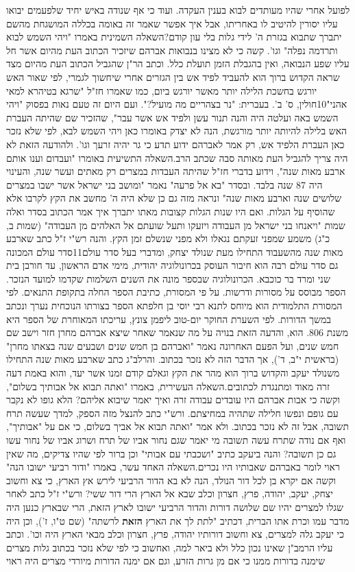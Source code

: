 \documentclass[12pt, openany]{book}
\begin{document}
לפועל אחרי שהיו מעותדים לבוא בענין העקדה. ועוד כי אף שנודה באיש יחיד שלפעמים יבואו עליו יסורין להיטיב לו באחריתו, אבל איך אפשר שאמר זה באומה בכללה המושגחת מהשם יתברך שתבוא בגזרת ה' לידי גלות בלי עון קודם?השאלה השמינית באמרו "ויהי השמש לבוא ותרדמה נפלה" וגו'. קשה כי לא מצינו בנבואות אברהם שיזכיר הכתוב העת מהיום אשר חל עליו שפע הנבואה, ואין בהגבלת הזמן תועלת כלל. וכתב הר"ן שהגביל הכתוב העת מהיום מצד שראה הקדוש ברוך הוא להעביד לפיד אש בין הגזרים אחרי שיחשוך לגמרי, לפי שאור האש יורגש בחשכת הלילה יותר מאשר יורגש ביום, כמו שאמרו חז"ל "שרגא בטיהרא למאי אהני"10חולין, ס' ב'. בעברית: "נר בצהריים מה מועיל?". ועם היום זה טעם נאות בפסוק "ויהי השמש באה ועלטה היה והנה תנור עשן ולפיד אש אשר עבר", שהזכיר שם שהיתה העברת האש בלילה להיותה יותר מורגשת, הנה לא יצדק באומרו כאן ויהי השמש לבא, לפי שלא נזכר כאן העברת הלפיד אש, רק אמר לאברהם ידוע תדע כי גר יהיה זרעך וגו'. ולהודעה הזאת לא היה צריך להגביל העת מאותה סבה שכתב הרב.השאלה התשיעית באומרו "ועבדום וענו אותם ארבע מאות שנה", וידוע בדברי חז"ל שהיתה העבדות במצרים רק מאתים ועשר שנה, והעינוי היה 87 שנה בלבד. ובסדר "בא אל פרעה" נאמר "ומושב בני ישראל אשר ישבו במצרים שלושים שנה וארבע מאות שנה" ונראה מזה גם כן שלא היה ה' מחשב את הקץ לקרבו אלא שהוסיף על הגלות. ואם היו שנות הגלות קצובות מאתו יתברך איך אמר הכתוב בסדר ואלה שמות "ויאנחו בני ישראל מן העבודה ויזעקו ותעל שועתם אל האלהים מן העבודה" (שמות ב, כ"ג) משמע שמפני זעקתם נגאלו ולא מפני שנשלם זמן הקץ. והנה רש"י ז"ל כתב שארבע מאות שנה מהשעבוד התחילו מעת שנולד יצחק, ומדברי בעל סדר עולם11סדר עולם המכונה גם סדר עולם רבה הוא חיבור העוסק בכרונולוגיה יהודית, מימי אדם הראשון, עד חורבן בית שני ומרד בר כוכבא. הכרונולוגיה שבספר מונה את השנים השלמות שקדמו למועד הנזכר. הספר מבוסס על מסורות ודרשות. על פי המסורת, כתיבת הספר החלה בתקופת התנאים. לפי המסורת התלמודית הוא מיוחס לתנא רבי יוסי בן חלפתא הספר בצורתו הנוכחית נערך ונכתב במשך הדורות. לפי השערת החוקר יום-טוב ליפמן צונץ, עריכתו המאוחרת של הספר היא משנת 806. הוא, והדעה הזאת בנויה על מה שנאמר שאחר שיצא אברהם מחרן חזר וישב שם חמש שנים, ועל הפעם האחרונה נאמר "ואברהם בן חמש שנים ושבעים שנה בצאתו מחרן" (בראשית י"ב, ד'), אך הדבר הזה לא נזכר בכתוב. והרלב"ג כתב שארבע מאות שנה התחילו משנולד יעקב והקדוש ברוך הוא מהר את הקץ וגאלם קודם זמנו אשר יעד, והוא באמת דעה זרה מאוד ומתנגדת לכתובים.השאלה העשירית, באמרו "ואתה תבוא אל אבותיך בשלום", וקשה כי אבות אברהם היו עובדים עבודה זרה ואיך יאמר שיבוא אליהם? הלא גופו לא נקבר עם גופם ונפשו חלילה שתהיה במחיצתם. ורש"י כתב להנצל מזה הספק, למדך שעשה תרח תשובה, אבל זה לא נזכר בכתוב. ולא אמר "ואתה תבוא אל אביך בשלום, כי אם על "אבותיך", ואף אם נודה שתרח עשה תשובה מי יאמר שגם נחור אביו של תרח ושרוג אביו של נחור עשו גם כן תשובה? והנה ביעקב כתיב "ושכבתי עם אבותי" וכן ברור לפי שהיו צדיקים, מה שאין ראוי לומר באברהם שאבותיו היו נכרים.השאלה האחד עשר, באמרו "ודור רביעי ישובו הנה" וקשה אם יקרא בן לכל דור הנולד, הנה לא בא הדור הרביעי לירש אץ הארץ, כי צא וחשוב יצחק, יעקב, יהודה, פרץ, חצרון וכלב שבא אל הארץ הרי דור ששי? ורש"י ז"ל כתב לאחר שגלו למצרים יהיו שם שלושה דורות והדור הרביעי ישובו לארץ הזאת, הרי שבארץ כנען היה מדבר עמו וכרת אתו הברית, דכתיב "לתת לך את הארץ \textrm{\textbf{הזאת}} לרשתה" (שם ט"ו, ז'), וכן היה כי יעקב גלה למצרים, צא וחשוב דורותיו יהודה, פרץ, חצרון וכלב מבאי הארץ היה וכו'. וכתב עליו הרמב"ן שאינו נכון כלל ולא ביאר למה, ואחשוב כי לפי שלא נזכר בכתוב גלות מצרים שימנה בדורות ממנו כי אם מן גרות הזרע, וגם אם ימנה הדורות מיורדי מצרים היה ראוי 
\end{document}
